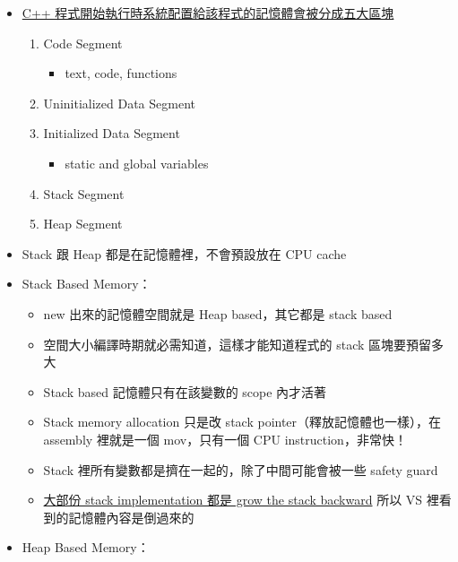 \documentclass[11pt]{article}
\providecommand{\tightlist}{%
      \setlength{\itemsep}{0pt}\setlength{\parskip}{0pt}}
\begin{document}
\begin{itemize}
\tightlist
\item
  \href{https://stackoverflow.com/questions/14588767/where-in-memory-are-my-variables-stored-in-c}{C++
  程式開始執行時系統配置給該程式的記憶體會被分成五大區塊}

  \begin{enumerate}
  \def\labelenumi{\arabic{enumi}.}
  \tightlist
  \item
    Code Segment

    \begin{itemize}
    \tightlist
    \item
      text, code, functions
    \end{itemize}
  \item
    Uninitialized Data Segment
  \item
    Initialized Data Segment

    \begin{itemize}
    \tightlist
    \item
      static and global variables
    \end{itemize}
  \item
    Stack Segment
  \item
    Heap Segment
  \end{enumerate}
\item
  Stack 跟 Heap 都是在記憶體裡，不會預設放在 CPU cache
\item
  Stack Based Memory：

  \begin{itemize}
  \tightlist
  \item
    new 出來的記憶體空間就是 Heap based，其它都是 stack based
  \item
    空間大小編譯時期就必需知道，這樣才能知道程式的 stack 區塊要預留多大
  \item
    Stack based 記憶體只有在該變數的 scope 內才活著
  \item
    Stack memory allocation 只是改 stack pointer（釋放記憶體也一樣），在
    assembly 裡就是一個 mov，只有一個 CPU instruction，非常快！
  \item
    Stack 裡所有變數都是擠在一起的，除了中間可能會被一些 safety guard
  \item
    \href{https://youtu.be/wJ1L2nSIV1s?list=PLlrATfBNZ98dudnM48yfGUldqGD0S4FFb\&t=419}{大部份
    stack implementation 都是 grow the stack backward} 所以 VS
    裡看到的記憶體內容是倒過來的
  \end{itemize}
\item
  Heap Based Memory：


\end{itemize}
\end{document}
